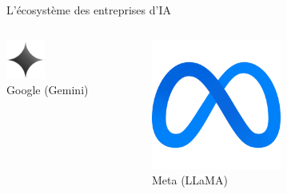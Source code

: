 \documentclass[aspectratio=169]{beamer}
\begin{document}
\begin{frame}{L'écosystème des entreprises d'IA}
\begin{columns}
\begin{column}{0.3\textwidth}
\begin{center}
                \includegraphics[width=0.3\textwidth]{images/gemini.png} 
                \\ Google (Gemini)
                
                
            \end{center}
        \end{column}
        \begin{column}{0.3\textwidth}
                \includegraphics[width=0.5\textwidth]{images/meta-color.png}
                \\ Meta (LLaMA)
        \end{column}
    \end{columns}
\end{frame}
\end{document}
